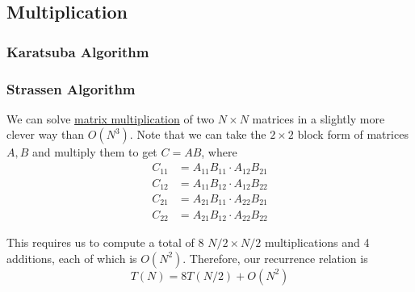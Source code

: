 \subsection{Multiplication}

  \subsubsection{Karatsuba Algorithm}


  \subsubsection{Strassen Algorithm}

    We can solve \hyperref[lin-def:matrix-multiplication]{matrix multiplication} of two $N \times N$ matrices in a slightly more clever way than $O(N^3)$. Note that we can take the $2 \times 2$ block form of matrices $A, B$ and multiply them to get $C = AB$, where 
    \begin{align}
      C_{11} & = A_{11} B_{11} \cdot A_{12} B_{21} \\ 
      C_{12} & = A_{11} B_{12} \cdot A_{12} B_{22} \\ 
      C_{21} & = A_{21} B_{11} \cdot A_{22} B_{21} \\ 
      C_{22} & = A_{21} B_{12} \cdot A_{22} B_{22} 
    \end{align}

    This requires us to compute a total of $8$ $N/2 \times N/2$ multiplications and 4 additions, each of which is $O(N^2)$. Therefore, our recurrence relation is 
    \begin{equation}
      T(N) = 8 T(N/2) + O(N^2)
    \end{equation}

